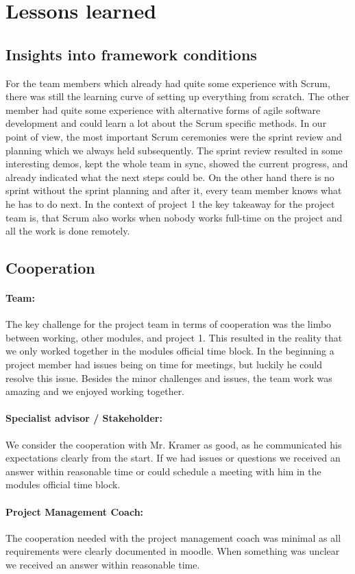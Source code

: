 \section{Lessons learned}\label{sec:lessons-learned}

\subsection{Insights into framework conditions}\label{subsec:insights-into-framework-conditions}
For the team members which already had quite some experience with Scrum,
there was still the learning curve of setting up everything from scratch.
The other member had quite some experience with alternative forms of agile software development and could learn a lot about the Scrum specific methods.
In our point of view, the most important Scrum ceremonies were the sprint review and planning
which we always held subsequently.
The sprint review resulted in some interesting demos, kept the whole team in sync, showed the current progress, and
already indicated what the next steps could be.
On the other hand there is no sprint without the sprint planning and after it, every team member knows what he has to do next.
In the context of project 1 the key takeaway for the project team is, that Scrum also works when nobody works full-time
on the project and all the work is done remotely.

\subsection{Cooperation}\label{subsec:cooperation}
\paragraph{Team:}
The key challenge for the project team in terms of cooperation was the limbo between working, other modules, and project 1.
This resulted in the reality that we only worked together in the modules official time block.
In the beginning a project member had issues being on time for meetings, but luckily he could resolve this issue.
Besides the minor challenges and issues, the team work was amazing and we enjoyed working together.

\paragraph{Specialist advisor / Stakeholder:}
We consider the cooperation with Mr. Kramer as good, as he communicated his expectations clearly from the start.
If we had issues or questions we received an answer within reasonable time or could schedule a meeting with him in the
modules official time block.

\paragraph{Project Management Coach:}
The cooperation needed with the project management coach was minimal as all requirements were clearly documented in moodle.
When something was unclear we received an answer within reasonable time.
